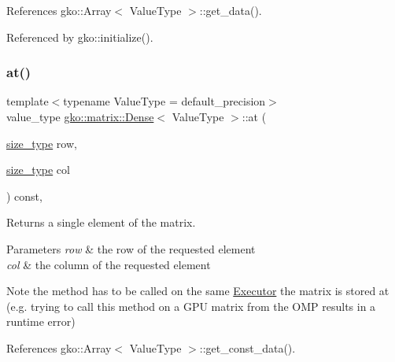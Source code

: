 References gko\+::\+Array$<$ Value\+Type $>$\+::get\+\_\+data().



Referenced by gko\+::initialize().

\mbox{\label{classgko_1_1matrix_1_1Dense_ae0b30c42359a03805dee41a5cbf87b26}} 
\subsubsection{\texorpdfstring{at()}{at()}\hspace{0.1cm}{\footnotesize\ttfamily [2/4]}}
{\footnotesize\ttfamily template$<$typename Value\+Type = default\+\_\+precision$>$ \\
value\+\_\+type \hyperlink{classgko_1_1matrix_1_1Dense}{gko\+::matrix\+::\+Dense}$<$ Value\+Type $>$\+::at (\begin{DoxyParamCaption}\item[{\hyperlink{namespacegko_a6e5c95df0ae4e47aab2f604a22d98ee7}{size\+\_\+type}}]{row,  }\item[{\hyperlink{namespacegko_a6e5c95df0ae4e47aab2f604a22d98ee7}{size\+\_\+type}}]{col }\end{DoxyParamCaption}) const\hspace{0.3cm}{\ttfamily [inline]}, {\ttfamily [noexcept]}}



Returns a single element of the matrix. 


\begin{DoxyParams}{Parameters}
{\em row} & the row of the requested element \\
\hline
{\em col} & the column of the requested element\\
\hline
\end{DoxyParams}
\begin{DoxyNote}{Note}
the method has to be called on the same \hyperlink{classgko_1_1Executor}{Executor} the matrix is stored at (e.\+g. trying to call this method on a G\+PU matrix from the O\+MP results in a runtime error) 
\end{DoxyNote}


References gko\+::\+Array$<$ Value\+Type $>$\+::get\+\_\+const\+\_\+data().

\mbox{\label{classgko_1_1matrix_1_1Dense_ae6ce7585b533123b5572ddf502c9970f}} 
